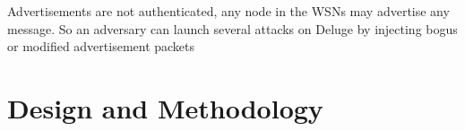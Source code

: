 \documentclass[conference,final]{IEEEtran}
\newcommand{\dme}[2]{\pdfmarkupcomment[markup=Highlight,color=yellow]{#1}{#2}}
\begin{document}
Advertisements are not authenticated, any node in the WSNs may advertise any message. So an adversary can 
launch several attacks on Deluge by injecting bogus or modified advertisement packets 




\section{Design and Methodology}

%
\end{document}

